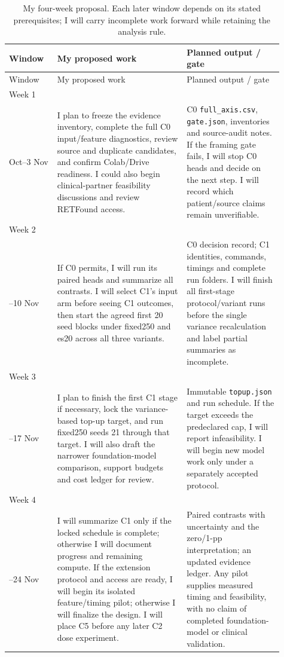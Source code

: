 \documentclass[11pt,a4paper]{article}
\newcommand{\file}[1]{\nolinkurl{#1}}
\begin{document}
\begin{longtable}{>{\raggedright\arraybackslash}p{0.16\linewidth}
                  >{\raggedright\arraybackslash}p{0.43\linewidth}
                  >{\raggedright\arraybackslash}p{0.32\linewidth}}
\caption{My four-week proposal. Each later window depends on its stated
prerequisites; I will carry incomplete work forward while retaining the analysis rule.}
\label{tab:weeks}\\
\toprule
Window & My proposed work & Planned output / gate\\
\midrule
\endfirsthead
\toprule Window & My proposed work & Planned output / gate\\\midrule
\endhead
\bottomrule\endfoot
Week 1\\28 Oct--3 Nov &
I plan to freeze the evidence inventory, complete the full C0 input/feature
diagnostics, review source and duplicate candidates, and confirm Colab/Drive
readiness. I could also begin clinical-partner feasibility discussions and
review RETFound access. &
C0 \file{full_axis.csv}, \file{gate.json}, inventories and source-audit notes.
If the framing gate fails, I will stop C0 heads and decide on the next step.
I will record which patient/source claims remain unverifiable.\\
Week 2\\4--10 Nov &
If C0 permits, I will run its paired heads and summarize all contrasts.
I will select C1's input arm before seeing C1 outcomes, then start the agreed
first 20 seed blocks under fixed250 and es20 across all three variants. &
C0 decision record; C1 identities, commands, timings and complete run folders.
I will finish all first-stage protocol/variant runs before the single
variance recalculation and label partial summaries as incomplete.\\
Week 3\\11--17 Nov &
I plan to finish the first C1 stage if necessary, lock the variance-based
top-up target, and run fixed250 seeds 21 through that target. I will also draft
the narrower foundation-model comparison, support budgets and cost ledger
for review. &
Immutable \file{topup.json} and run schedule. If the target exceeds the
predeclared cap, I will report infeasibility. I will begin new model work only
under a separately accepted protocol.\\
Week 4\\18--24 Nov &
I will summarize C1 only if the locked schedule is complete; otherwise I will
document progress and remaining compute. If the extension protocol and access
are ready, I will begin its isolated feature/timing pilot; otherwise I will
finalize the design. I will place C5 before any later C2 dose experiment. &
Paired contrasts with uncertainty and the zero/1-pp interpretation; an updated
evidence ledger. Any pilot supplies measured timing and feasibility, with no
claim of completed foundation-model or clinical validation.\\
\end{longtable}
\end{document}
